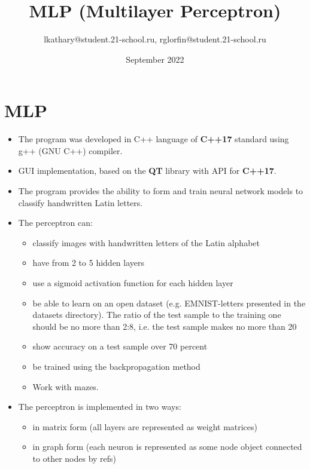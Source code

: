 \documentclass{article}
\title{MLP (Multilayer Perceptron)}
\author{lkathary@student.21-school.ru, rglorfin@student.21-school.ru}
\date{September 2022}
\begin{document}
\maketitle

\section{MLP}
\begin{itemize}
    \item The program was developed in C++ language of \textbf{C++17} standard using g++ (GNU C++) compiler.
    \item GUI implementation, based on the \textbf{QT} library with API for \textbf{C++17}.
    \item The program provides the ability to
    form and train neural network models to classify handwritten Latin letters.
    \item The perceptron can:

    \begin{itemize}
        \item       classify images with handwritten letters of the Latin alphabet
        \item       have from 2 to 5 hidden layers
        \item       use a sigmoid activation function for each hidden layer
        \item       be able to learn on an open dataset (e.g. EMNIST-letters presented in the datasets directory). The ratio of the test sample to the training one should be no more than 2:8, i.e. the test sample makes no more than 20%
        \item       show accuracy on a test sample over 70 percent
        \item      be trained using the backpropagation method
        \item      Work with mazes.
    \end{itemize}

    \item The perceptron is implemented in two ways:
    \begin{itemize}
        \item   in matrix form (all layers are represented as weight matrices)
        \item   in graph form (each neuron is represented as some node object connected to other nodes by refs)
    \end{itemize}


\end{itemize}
\end{document}
